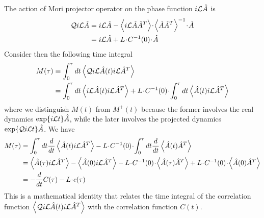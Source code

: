 \documentclass[a4paper,openright,12pt]{book}
\newcommand{\esc}{\!\cdot\!}
\newcommand{\llangle}{\left\langle}
\newcommand{\rrangle}{\right\rangle}
\begin{document}
The action  of Mori projector  operator on the phase  function $i{\cal
  L}\hat{A}$ is
\begin{align}
{\cal Q} i{\cal L}\hat{A} &= i{\cal L}\hat{A}-\llangle i{\cal L}\hat{A} \hat{A}^T\rrangle\esc \llangle\hat{A}\hat{A}^T\rrangle^{-1}\esc \hat{A}
\nonumber\\
&=
i{\cal L}\hat{A}+L\esc C^{-1}(0)\esc \hat{A}  
\label{QiLA}
\end{align}
Consider then the following time integral
\begin{align}
M(\tau)&\equiv  \int_0^{\tau} dt \llangle {\cal Q} i{\cal L}\hat{A} (t)i{\cal L}\hat{A}^T\rrangle
\nonumber\\
&=
  \int_0^{\tau} dt \llangle i{\cal L}\hat{A}(t) i{\cal L}\hat{A}^T\rrangle
+L\esc C^{-1}(0)\esc   \int_0^{\tau} dt \llangle \hat{A}(t) i{\cal L}\hat{A}^T\rrangle
\end{align}
where we distinguish $M(t)$ from $M^+(t)$ because the former
involves  the real dynamics $\exp\{i{\cal  L}t\}\hat{A}$, while
the later involves the projected dynamics $\exp\{{\cal Q}i{\cal  L}t\}\hat{A}$.
We have
\begin{align}
M(\tau)&=
  \int_0^{\tau} dt \frac{d}{dt}\llangle \hat{A}(t) i{\cal L}\hat{A}^T\rrangle
-L\esc C^{-1}(0)\esc   \int_0^{\tau} dt \frac{d}{dt}\llangle \hat{A}(t) \hat{A}^T\rrangle
\nonumber\\
&=\llangle \hat{A}(\tau) i{\cal L}\hat{A}^T\rrangle-\llangle \hat{A}(0) i{\cal L}\hat{A}^T\rrangle
-L\esc C^{-1}(0)\esc   \llangle \hat{A}(\tau) \hat{A}^T\rrangle
+L\esc C^{-1}(0)\esc   \llangle \hat{A}(0) \hat{A}^T\rrangle
\nonumber\\
&=-\frac{d}{dt}C(\tau)-L\esc c(\tau)
\label{Math1}
\end{align}
This is a mathematical identity that  relates the time integral of the
correlation  function $\llangle  {\cal Q}  i{\cal L}\hat{A}  (t)i{\cal
  L}\hat{A}^T\rrangle$ with  the correlation  function $C(t)$. 
\end{document}
